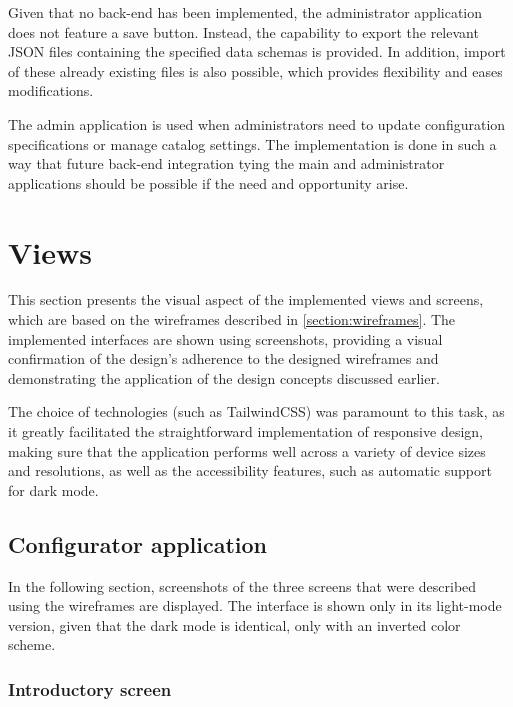 Given that no back-end has been implemented, the administrator application does not feature a save button. Instead, the capability to export the relevant JSON files containing the specified data schemas is provided. In addition, import of these already existing files is also possible, which provides flexibility and eases modifications.

The admin application is used when administrators need to update configuration specifications or manage catalog settings. The implementation is done in such a way that future back-end integration tying the main and administrator applications should be possible if the need and opportunity arise.


\section{Views}

This section presents the visual aspect of the implemented views and screens, which are based on the wireframes described in \autoref{section:wireframes}. The implemented interfaces are shown using screenshots, providing a visual confirmation of the design's adherence to the designed wireframes and demonstrating the application of the design concepts discussed earlier.

The choice of technologies (such as TailwindCSS) was paramount to this task, as it greatly facilitated the straightforward implementation of responsive design, making sure that the application performs well across a variety of device sizes and resolutions, as well as the accessibility features, such as automatic support for dark mode.

\subsection{Configurator application}

In the following section, screenshots of the three screens that were described using the wireframes are displayed. The interface is shown only in its light-mode version, given that the dark mode is identical, only with an inverted color scheme.

\subsubsection{Introductory screen}

